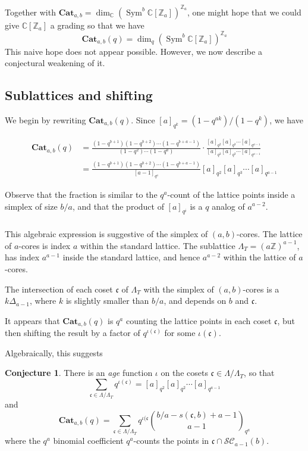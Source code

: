 \documentclass{amsart}[12pt]
\theoremstyle{definition}
\newtheorem{conjecture}[dummy]{Conjecture}
\newcommand{\Z}{\mathbb{Z}}
\newcommand{\C}{\mathbb{C}}
\newcommand{\Cat}{\mathbf{Cat}}
\DeclareMathOperator{\Sym}{Sym}
\begin{document}
Together with $\Cat_{a,b}=\dim_\C(\Sym^b\C[\Z_a])^{\Z_a}$, one
might hope that we could give $\C[\Z_a]$ a grading so that we have
$$\Cat_{a,b}(q)=\dim_q(\Sym^b \C[\Z_a])^{\Z_a}$$
This naive hope does not appear possible.  However, we now describe a
conjectural weakening of it.

\subsection{Sublattices and shifting}

We begin by rewriting $\Cat_{a,b}(q)$.  Since $[a]_{q^k}=(1-q^{ak})/(1-q^k)$, we have

\begin{align*}
\Cat_{a,b}(q)&=\frac{(1-q^{b+1})(1-q^{b+2})\cdots (1-q^{b+a-1})}{(1-q^2)\cdots(1-q^a)} \cdot \frac{[a]_{q^2}[a]_{q^3}\cdots[a]_{q^{a-1}}}{[a]_{q^2}[a]_{q^3}\cdots[a]_{q^{a-1}}} \\
&=\frac{(1-q^{b+1})(1-q^{b+2})\cdots (1-q^{b+a-1})}{[a-1]_{q^a}}[a]_{q^2}[a]_{q^3}\cdots[a]_{q^{a-1}}
\end{align*}

Observe that the fraction is similar to the $q^a$-count of the lattice
points inside a simplex of size $b/a$, and that the product of $[a]_{q^i}$ is a $q$ analog of $a^{a-2}$.

\subsubsection{}
This algebraic expression is suggestive of the simplex of
$(a,b)$-cores.  The lattice of $a$-cores is index $a$ within
the standard lattice.  The sublattice $\Lambda_T=(a\Z)^{a-1}$, has index $a^{a-1}$ inside the standard lattice, and hence $a^{a-2}$ within the lattice of $a$-cores.

The intersection of each coset $\mathfrak{c}$ of $\Lambda_T$ with the simplex of
$(a,b)$-cores is a $k\Delta_{a-1}$, where $k$ is slightly smaller than $b/a$, and depends on $b$ and $\mathfrak{c}$.


It appears that
$\Cat_{a,b}(q)$ is $q^a$ counting the lattice points in each coset $\mathfrak{c}$,
but then shifting the result by a factor of $q^{\iota(\mathfrak{c})}$ for some $\iota(\mathfrak{c})$.

Algebraically, this suggests
\begin{conjecture} \label{conj:cosets}
There is an \emph{age} function $\iota$ on the cosets $\mathfrak{c}\in\Lambda/\Lambda_T$, so that
$$\sum_{\mathfrak{c}\in\Lambda/\Lambda_T} q^{\iota(\mathfrak{c})}=[a]_{q^2}[a]_{q^2}\cdots[a]_{q^{a-1}}$$
 and
$$\Cat_{a,b}(q)=\sum_{\mathfrak{c}\in\Lambda/\Lambda_T} q^{\iota(\mathfrak{c}} \binom{b/a-s(\mathfrak{c},b)+a-1 }{a-1}_{q^a}$$
where the $q^a$ binomial coefficient $q^a$-counts the points in $\mathfrak{c}\cap \mathcal{SC}_{a-1}(b)$.
\end{conjecture}
\end{document}
